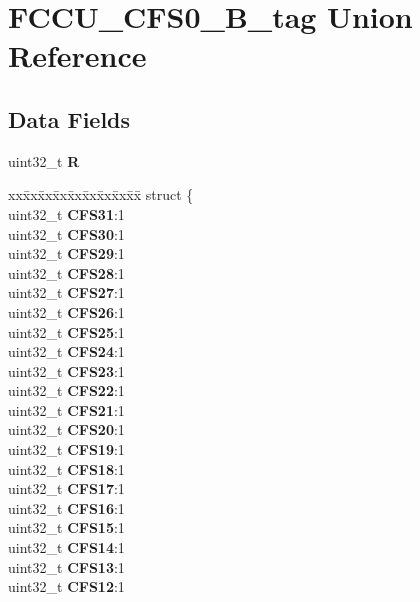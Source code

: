 \hypertarget{unionFCCU__CFS0__32B__tag}{}\section{F\+C\+C\+U\+\_\+\+C\+F\+S0\+\_\+B\+\_\+tag Union Reference}
\label{unionFCCU__CFS0__32B__tag}
\subsection*{Data Fields}
\begin{DoxyCompactItemize}
\item 
\mbox{\label{unionFCCU__CFS0__32B__tag_aaf9c334de7eeb368168e7b61f5958e70}} 
uint32\+\_\+t {\bfseries R}
\item 
\mbox{\label{unionFCCU__CFS0__32B__tag_a4eac591d87282c421c7bc24fbc056821}} 
\begin{tabbing}
xx\=xx\=xx\=xx\=xx\=xx\=xx\=xx\=xx\=\kill
struct \{\\
\>uint32\_t {\bfseries CFS31}:1\\
\>uint32\_t {\bfseries CFS30}:1\\
\>uint32\_t {\bfseries CFS29}:1\\
\>uint32\_t {\bfseries CFS28}:1\\
\>uint32\_t {\bfseries CFS27}:1\\
\>uint32\_t {\bfseries CFS26}:1\\
\>uint32\_t {\bfseries CFS25}:1\\
\>uint32\_t {\bfseries CFS24}:1\\
\>uint32\_t {\bfseries CFS23}:1\\
\>uint32\_t {\bfseries CFS22}:1\\
\>uint32\_t {\bfseries CFS21}:1\\
\>uint32\_t {\bfseries CFS20}:1\\
\>uint32\_t {\bfseries CFS19}:1\\
\>uint32\_t {\bfseries CFS18}:1\\
\>uint32\_t {\bfseries CFS17}:1\\
\>uint32\_t {\bfseries CFS16}:1\\
\>uint32\_t {\bfseries CFS15}:1\\
\>uint32\_t {\bfseries CFS14}:1\\
\>uint32\_t {\bfseries CFS13}:1\\
\>uint32\_t {\bfseries CFS12}:1\\

\end{tabbing}
\end{DoxyCompactItemize}
